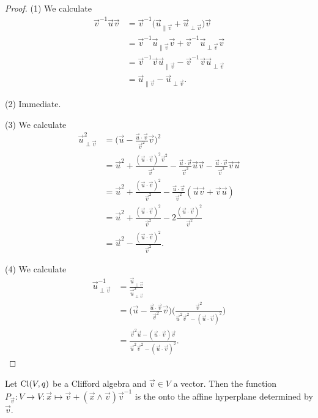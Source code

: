 \begin{proof}
(1) We calculate
\begin{align*}
\vec{v}^{-1}\vec{u}\vec{v} &= \vec{v}^{-1}\big(\vec{u}_{\parallel \vec{v}} + \vec{u}_{\perp \vec{v}}\big)\vec{v} \\
&= \vec{v}^{-1}\vec{u}_{\parallel \vec{v}}\vec{v} + \vec{v}^{-1}\vec{u}_{\perp \vec{v}}\vec{v} \\
&= \vec{v}^{-1}\vec{v}\vec{u}_{\parallel \vec{v}} - \vec{v}^{-1}\vec{v}\vec{u}_{\perp \vec{v}} \\
&=\vec{u}_{\parallel \vec{v}} - \vec{u}_{\perp \vec{v}}.
\end{align*}

(2) Immediate.

(3) We calculate
\begin{align*}
\vec{u}_{\perp \vec{v}}^2 &= \big(\vec{u} - \frac{\vec{u}\cdot \vec{v}}{\vec{v}^2}\vec{v}\big)^2 \\
&= \vec{u}^2 + \frac{(\vec{u}\cdot \vec{v})^2\vec{v}^2}{\vec{v}^4} - \frac{\vec{u}\cdot \vec{v}}{\vec{v}^2}\vec{u}\vec{v} - \frac{\vec{u}\cdot \vec{v}}{\vec{v}^2}\vec{v}\vec{u} \\
&= \vec{u}^2 + \frac{(\vec{u}\cdot \vec{v})^2}{\vec{v}^2} - \frac{\vec{u}\cdot \vec{v}}{\vec{v}^2}(\vec{u}\vec{v} + \vec{v}\vec{u}) \\
&= \vec{u}^2 + \frac{(\vec{u}\cdot \vec{v})^2}{\vec{v}^2} - 2\frac{(\vec{u}\cdot \vec{v})^2}{\vec{v}^2} \\
&= \vec{u}^2 - \frac{(\vec{u}\cdot \vec{v})^2}{\vec{v}^2}.
\end{align*}

(4) We calculate
\begin{align*}
\vec{u}_{\perp \vec{v}}^{-1} &= \frac{\vec{u}_{\perp \vec{v}}}{\vec{u}_{\perp \vec{v}}^2} \\
&= \Big(\vec{u} - \frac{\vec{u}\cdot \vec{v}}{\vec{v}^2}\vec{v}\Big)\Big(\frac{\vec{v}^2}{\vec{u}^2 \vec{v}^2 - (\vec{u}\cdot \vec{v})^2}\Big) \\
&= \frac{\vec{v}^2 \vec{u} - (\vec{u}\cdot\vec{v})\vec{v}}{\vec{u}^2 \vec{v}^2 - (\vec{u}\cdot \vec{v})^2}.
\end{align*}
\end{proof}

\begin{definition}
Let $\operatorname{Cl}(V,q)$ be a Clifford algebra and $\vec{v}\in V$ a vector. Then the function $P_{\vec{v}}: V\to V: \vec{x}\mapsto \vec{v} + (\vec{x}\wedge \vec{v})\vec{v}^{-1}$ is the  onto the affine hyperplane determined by $\vec{v}$.
\end{definition}


